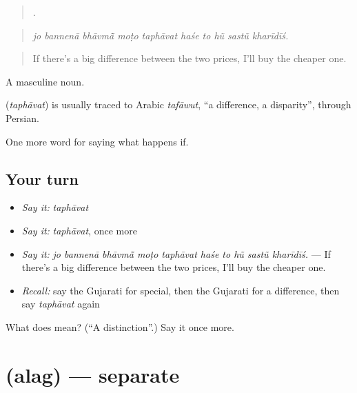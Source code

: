 \begin{quote}
         .
\end{quote}

\begin{quote}
\emph{jo bannenā bhāvmā̃ moṭo taphāvat haśe to hũ sastũ kharīdīś.}
\end{quote}

\begin{quote}
If there's a big difference between the two prices, I'll buy the cheaper one.
\end{quote}

A masculine noun.

\begin{cousinweb}
\textbf{} (\emph{taphāvat}) is usually traced to Arabic \emph{tafāwut}, \textquotedblleft{}a difference, a disparity\textquotedblright{}, through Persian.
\end{cousinweb}

\begin{grammarlens}[title={What you've built}]
One more word for saying what happens if.
\end{grammarlens}

\subsection*{Your turn}
\begin{itemize}
\raggedright
  \item \emph{Say it:} \emph{taphāvat}
  \item \emph{Say it:} \emph{taphāvat}, once more
  \item \emph{Say it:} \emph{jo bannenā bhāvmā̃ moṭo taphāvat haśe to hũ sastũ kharīdīś.} — If there's a big difference between the two prices, I'll buy the cheaper one.
  \item \emph{Recall:} say the Gujarati for special, then the Gujarati for a difference, then say \emph{taphāvat} again
\end{itemize}

\begin{tcolorbox}[breakable,colback=teal!4,colframe=teal!35!black,title={Before you move on}]
What does  mean? (\textquotedblleft{}A distinction\textquotedblright{}.) Say it once more.
\end{tcolorbox}
\section[\texorpdfstring{\gu{અલગ} (alag)}{અલગ (alag)}]{ (alag) — separate}

